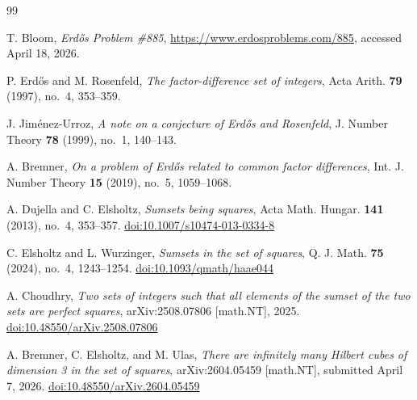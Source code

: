 \documentclass[11pt]{article}
\theoremstyle{plainbreak}
\theoremstyle{defbreak}
\begin{document}
\begin{thebibliography}{99}

T. Bloom,
\emph{Erd\H{o}s Problem \#885},
\url{https://www.erdosproblems.com/885},
accessed April 18, 2026.

P. Erd\H{o}s and M. Rosenfeld,
\emph{The factor-difference set of integers},
Acta Arith. \textbf{79} (1997), no.~4, 353--359.

J. Jim\'enez-Urroz,
\emph{A note on a conjecture of Erd\H{o}s and Rosenfeld},
J. Number Theory \textbf{78} (1999), no.~1, 140--143.

A. Bremner,
\emph{On a problem of Erd\H{o}s related to common factor differences},
Int. J. Number Theory \textbf{15} (2019), no.~5, 1059--1068.

A. Dujella and C. Elsholtz,
\emph{Sumsets being squares},
Acta Math. Hungar. \textbf{141} (2013), no.~4, 353--357.
\href{https://doi.org/10.1007/s10474-013-0334-8}{doi:10.1007/s10474-013-0334-8}

C. Elsholtz and L. Wurzinger,
\emph{Sumsets in the set of squares},
Q. J. Math. \textbf{75} (2024), no.~4, 1243--1254.
\href{https://doi.org/10.1093/qmath/haae044}{doi:10.1093/qmath/haae044}

A. Choudhry,
\emph{Two sets of integers such that all elements of the sumset of the two
sets are perfect squares},
arXiv:2508.07806 [math.NT], 2025.
\href{https://doi.org/10.48550/arXiv.2508.07806}{doi:10.48550/arXiv.2508.07806}

A. Bremner, C. Elsholtz, and M. Ulas,
\emph{There are infinitely many Hilbert cubes of dimension 3 in the set of
squares},
arXiv:2604.05459 [math.NT], submitted April 7, 2026.
\href{https://doi.org/10.48550/arXiv.2604.05459}{doi:10.48550/arXiv.2604.05459}

\end{thebibliography}
\end{document}
